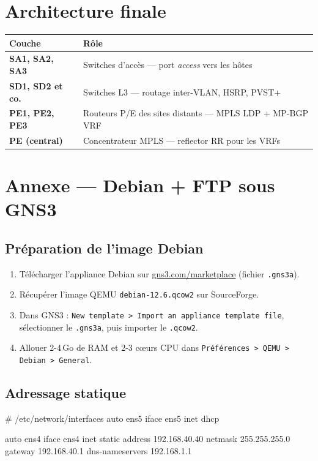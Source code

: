 \documentclass[11pt,a4paper]{article}
\begin{document}
\section{Architecture finale}

\renewcommand{\arraystretch}{1.35}
\begin{tabularx}{\linewidth}{@{}>{\bfseries}p{2.6cm} X@{}}
\toprule
\rowcolor{light} Couche & Rôle \\ \midrule
SA1, SA2, SA3   & Switches d'accès — port \textit{access} vers les hôtes \\
SD1, SD2 et co. & Switches L3 — routage inter-VLAN, HSRP, PVST+ \\
PE1, PE2, PE3   & Routeurs P/E des sites distants — MPLS LDP + MP-BGP VRF \\
PE (central)    & Concentrateur MPLS — reflector RR pour les VRFs \\
\bottomrule
\end{tabularx}

\section{Annexe — Debian + FTP sous GNS3}

\subsection{Préparation de l'image Debian}
\begin{enumerate}
  \item Télécharger l'appliance Debian sur \href{https://gns3.com/marketplace/appliances/debian-2}{gns3.com/marketplace} (fichier \texttt{.gns3a}).
  \item Récupérer l'image QEMU \texttt{debian-12.6.qcow2} sur SourceForge.
  \item Dans GNS3 : \texttt{New template > Import an appliance template file}, sélectionner le \texttt{.gns3a}, puis importer le \texttt{.qcow2}.
  \item Allouer 2-4\,Go de RAM et 2-3 c\oe{}urs CPU dans \texttt{Préférences > QEMU > Debian > General}.
\end{enumerate}

\subsection{Adressage statique}

\begin{ciscobox}[listing options={style=cisco,language=bash}]
# /etc/network/interfaces
auto ens5
iface ens5 inet dhcp

auto ens4
iface ens4 inet static
    address 192.168.40.40
    netmask 255.255.255.0
    gateway 192.168.40.1
    dns-nameservers 192.168.1.1
\end{ciscobox}
\end{document}
